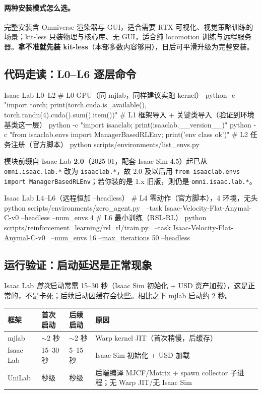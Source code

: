 \paragraph{两种安装模式怎么选。}完整安装含 Omniverse 渲染器与 GUI，适合需要 RTX 可视化、视觉策略训练的场景；kit-less 只装物理与核心库、无 GUI，适合纯 locomotion 训练与远程服务器。\textbf{拿不准就先装 kit-less}（本部多数内容够用），日后可平滑升级为完整安装。

\subsection{代码走读：L0--L6 逐层命令}

\begin{codebox}[bash]{Isaac Lab L0--L2}
# L0 GPU（同 mjlab，同样建议实跑 kernel）
python -c "import torch; print(torch.cuda.is_available(), torch.randn(4).cuda().sum().item())"
# L1 框架导入 + 关键类导入（验证到环境基类这一层）
python -c "import isaaclab; print(isaaclab.__version__)"
python -c "from isaaclab.envs import ManagerBasedRLEnv; print('env class ok')"
# L2 任务注册（官方脚本）
python scripts/environments/list_envs.py
\end{codebox}
模块前缀自 Isaac Lab \textbf{2.0}（2025-01，配套 Isaac Sim 4.5）起已从 \texttt{omni.isaac.lab.*} 改为 \texttt{isaaclab.*}，故 2.0 及以后用 \texttt{from isaaclab.envs import ManagerBasedRLEnv}；若你装的是 1.x 旧版，则仍是 \texttt{omni.isaac.lab.*}。

\begin{codebox}[bash]{Isaac Lab L4--L6（远程恒加 --headless）}
# L4 零动作（官方脚本），4 环境，无头
python scripts/environments/zero_agent.py \
    --task Isaac-Velocity-Flat-Anymal-C-v0 --headless --num_envs 4
# L6 最小训练（RSL-RL）
python scripts/reinforcement_learning/rsl_rl/train.py \
    --task Isaac-Velocity-Flat-Anymal-C-v0 \
    --num_envs 16 --max_iterations 50 --headless
\end{codebox}

\subsection{运行验证：启动延迟是正常现象}

Isaac Lab \emph{首次}启动常需 15--30 秒（Isaac Sim 初始化 + USD 资产加载），这是正常的，不是卡死；后续启动因缓存会快些。相比之下 mjlab 启动约 2 秒。

\begin{center}
\small
\begin{tabular}{@{}llll@{}}
\toprule
框架 & 首次启动 & 后续启动 & 原因 \\
\midrule
mjlab & $\sim$2 秒 & $\sim$2 秒 & Warp kernel JIT（首次稍慢，后缓存） \\
Isaac Lab & 15--30 秒 & 5--15 秒 & Isaac Sim 初始化 + USD 加载 \\
UniLab & 秒级 & 秒级 & 后端编译 MJCF/Motrix + spawn collector 子进程；无 Warp JIT/无 Isaac Sim \\
\bottomrule
\end{tabular}
\end{center}


